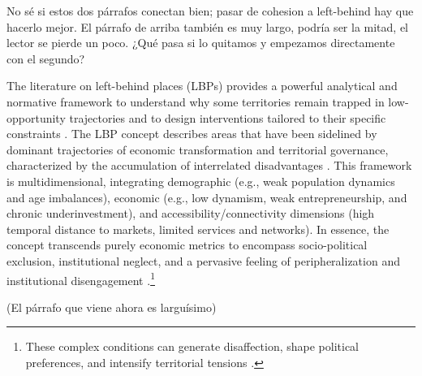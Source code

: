 \documentclass[a4paper,11pt,oneside]{article}
\begin{document}
{\color{red} No sé si estos dos párrafos conectan bien; pasar de cohesion a left-behind hay que hacerlo mejor. El párrafo de arriba también es muy largo, podría ser la mitad, el lector se pierde un poco. ¿Qué pasa si lo quitamos y empezamos directamente con el segundo?}



The literature on left-behind places (LBPs) provides a powerful analytical and normative framework to understand why some territories remain trapped in low-opportunity trajectories and to design interventions tailored to their specific constraints \citep{rodriguez2024geography}. The LBP concept  \citep{pike_rachel_2023left,mackinnon_festival,faggian2024three} describes areas that have been sidelined by dominant trajectories of economic transformation and territorial governance, characterized by the accumulation of interrelated disadvantages \citep{davenport2020levelling, hendrickson_2018}. This framework is multidimensional, integrating demographic (e.g., weak population dynamics and age imbalances), economic (e.g., low dynamism, weak entrepreneurship, and chronic underinvestment), and accessibility/connectivity dimensions (high temporal distance to markets, limited services and networks). In essence, the concept transcends purely economic metrics to encompass socio-political exclusion, institutional neglect, and a pervasive feeling of peripheralization and institutional disengagement \citep{dijkstra2020geography}.\footnote{These complex conditions can generate disaffection, shape political preferences, and intensify territorial tensions \citep{tomaney2021levelling}.}


{\color{red} (El párrafo que viene ahora es larguísimo)}
\end{document}
